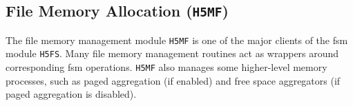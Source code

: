 
\subsection{File Memory Allocation (\texttt{H5MF})}



The file memory management module \texttt{H5MF} is one of the major clients of the \Gls{fsm} module \texttt{H5FS}. Many file memory management routines act as wrappers around corresponding \Gls{fsm} operations. \texttt{H5MF} also manages some higher-level memory processes, such as paged aggregation (if enabled) and free space aggregators (if paged aggregation is disabled).

